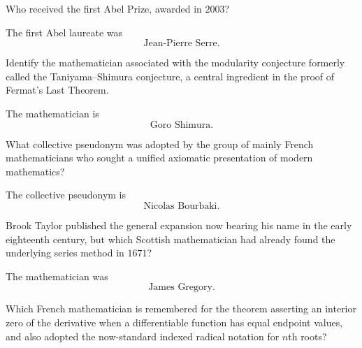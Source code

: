     \begin{expectedproblem}
        Who received the first Abel Prize, awarded in $2003$?
    \end{expectedproblem}

    \begin{solution}
        The first Abel laureate was
        \[
            \boxed{\text{Jean-Pierre Serre}}.
        \]
    \end{solution}

    \begin{expectedproblem}
        Identify the mathematician associated with the modularity conjecture
        formerly called the Taniyama--Shimura conjecture, a central ingredient
        in the proof of Fermat's Last Theorem.
    \end{expectedproblem}

    \begin{solution}
        The mathematician is
        \[
            \boxed{\text{Goro Shimura}}.
        \]
    \end{solution}

    \begin{expectedproblem}
        What collective pseudonym was adopted by the group of mainly French
        mathematicians who sought a unified axiomatic presentation of modern
        mathematics?
    \end{expectedproblem}

    \begin{solution}
        The collective pseudonym is
        \[
            \boxed{\text{Nicolas Bourbaki}}.
        \]
    \end{solution}

    \begin{expectedproblem}
        Brook Taylor published the general expansion now bearing his name in
        the early eighteenth century, but which Scottish mathematician had
        already found the underlying series method in $1671$?
    \end{expectedproblem}

    \begin{solution}
        The mathematician was
        \[
            \boxed{\text{James Gregory}}.
        \]
    \end{solution}

    \begin{expectedproblem}
        Which French mathematician is remembered for the theorem asserting an
        interior zero of the derivative when a differentiable function has
        equal endpoint values, and also adopted the now-standard indexed
        radical notation for $n$th roots?
    \end{expectedproblem}


